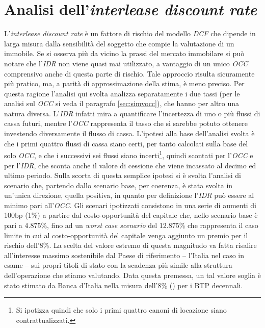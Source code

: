 \section{Analisi dell'{\itshape interlease discount rate}}
\label{sec:simvidr}
L'{\itshape interlease discount rate} è un fattore di rischio del modello \textit{DCF} che dipende in larga misura dalla sensibilità del soggetto che compie la valutazione di un immobile. Se si osserva più da vicino la prassi del mercato immobilare si può notare che l'\textit{IDR} non viene quasi mai utilizzato, a vantaggio di un unico \textit{OCC} comprensivo anche di questa parte di rischio. Tale approccio risulta sicuramente più pratico, ma, a parità di approssimazione della stima, è meno preciso. Per questa ragione l'analisi qui svolta analizza separatamente i due tassi (per le analisi sul \textit{OCC} si veda il paragrafo \ref{sec:simvocc}), che hanno per altro una natura diversa. L'\textit{IDR} infatti mira a quantificare l'incertezza di uno o più flussi di cassa futuri, mentre l'\textit{OCC} rappresenta il tasso che si sarebbe potuto ottenere investendo diversamente il flusso di cassa.
L'ipotesi alla base dell'analisi svolta è che i primi quattro flussi di cassa siano certi, per tanto calcolati sulla base del solo \textit{OCC}, e che i successivi sei flussi siano incerti\footnote{Si ipotizza quindi che solo i primi quattro canoni di locazione siano contrattualizzati.}, quindi scontati per l'\textit{OCC} e per l'\textit{IDR}, che sconta anche il valore di cessione che viene incassato al decimo ed ultimo periodo.
Sulla scorta di questa semplice ipotesi si è svolta l'analisi di scenario che, partendo dallo scenario base, per coerenza, è stata svolta in un'unica direzione, quella positiva, in quanto per definizione l'\textit{IDR} può essere al minimo pari all'\textit{OCC}. Gli scenari ipotizzati consistono in una serie di aumenti di 100bp (1\%) a partire dal costo-opportunità del capitale che, nello scenario base è pari a 4.875\%, fino ad un {\itshape worst case scenario} del 12.875\% che rappresenta il caso limite in cui al costo-opportunità del capitale venga aggiunto un premio per il rischio dell'8\%. La scelta del valore estremo di questa magnitudo va fatta risalire all'interesse massimo sostenibile dal Paese di riferimento -- l'Italia nel caso in esame -- sui propri titoli di stato con la scadenza più simile alla struttura dell'operazione che stiamo valutando. Data questa premessa, un tal valore soglia è stato stimato da Banca d'Italia nella misura dell'8\% (\cite[p. 59]{rapportobdistabilita}) per i BTP decennali.

